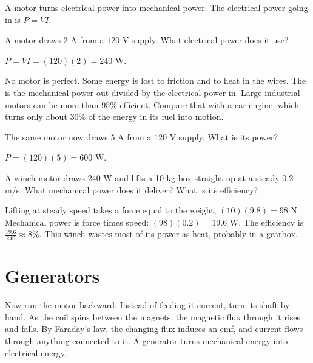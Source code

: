 A motor turns electrical power into mechanical power. The electrical power
going in is $P = VI$.

\begin{Worked}
\begin{Problem}
A motor draws $2$ A from a $120$ V supply. What
electrical power does it use?
\end{Problem}
\begin{Solution}
$P = VI = (120)(2) = 240$ W.
\end{Solution}
\end{Worked}

No motor is perfect. Some energy is lost to friction and to heat in the
wires. The  is the mechanical power out divided by the
electrical power in. Large industrial motors can be more than 95\%
efficient. Compare that with a car engine, which turns only about 30\% of
the energy in its fuel into motion.

\begin{Exercise}[title={Power at Higher Current}, label=emg1]
The same motor now draws $5$ A from a $120$ V supply. What is its power?
\end{Exercise}
\begin{Answer}[ref=emg1]
$P = (120)(5) = 600$ W.
\end{Answer}

\begin{Exercise}[title={Lifting with a motor}, label=emg_eff]
A winch motor draws 240 W and lifts a 10 kg box straight up at a steady
0.2 m/s. What mechanical power does it deliver? What is its efficiency?
\end{Exercise}
\begin{Answer}[ref=emg_eff]
Lifting at steady speed takes a force equal to the weight,
$(10)(9.8) = 98$ N. Mechanical power is force times speed:
$(98)(0.2) = 19.6$ W. The efficiency is $\frac{19.6}{240} \approx 8\%$.
This winch wastes most of its power as heat, probably in a gearbox.
\end{Answer}

\section{Generators}

Now run the motor backward. Instead of feeding it
current, turn its shaft by hand. As the coil spins between the magnets, the
magnetic flux through it rises and falls. By Faraday's law, the changing
flux induces an emf, and current flows through anything connected to it.
A generator turns mechanical energy into electrical energy.

